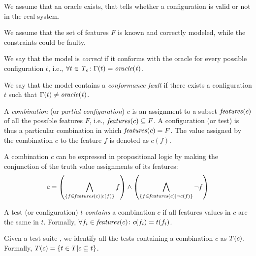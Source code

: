 \begin{tikzborder}{\cite{Gargantini16:validation}}
\begin{tikzborder}{\cite{gargantini_combinatorial_2017}}
\begin{tikzborder}{\cite{gargantini_combinatorial_2017}}
\begin{tikzborder}{\cite{garn2019}}
\begin{tikzborder}{\cite{arcaini2019achieving}}
\begin{tikzborder}{\cite{arcaini2019varivolution}}
		We assume that an oracle exists, that tells whether a configuration is valid or not in the real system.
		
		We assume that the set of features $F$ is known and correctly modeled, while the constraints could be faulty.
		
		\begin{mydef}\label{def:varivolution_correctness}
			We say that the model \m is \emph{correct} if it conforms with the oracle for every possible configuration $t$, i.e., $\forall t \in \mathit{T_e} \colon \Gamma(t) = \mathit{oracle(t)}$. 
		\end{mydef}
		
		\begin{mydef}\label{def:conformanceFault}
			We say that the model contains a \emph{conformance fault} if there exists a configuration $t$ such that $\Gamma(t) \neq \mathit{oracle(t)}$.
		\end{mydef}
		
		\begin{mydef}[Combination]\label{def:combination1}
			A \emph{combination} (or \emph{partial configuration}) $c$ is an assignment to a subset $\mathit{features}(c)$ of all the possible features $F$, i.e., $\mathit{features}(c) \subseteq F$. A configuration (or test) is thus a particular combination in which $\mathit{features}(c)=F$. The value assigned by the combination $c$ to the feature $f$ is denoted as $c(f)$.
		\end{mydef}
		
		\begin{mydef}
			A combination $c$ can be expressed in propositional logic by making the conjunction of the truth value assignments of its features:
			\[c = \left(\bigwedge_{\{f \in \mathit{features}(c) | c(f) \}} f\right) \wedge \left(\bigwedge_{\{f \in \mathit{features}(c) | \neg c(f) \}} \neg f\right)\]
		\end{mydef}
		
		\begin{mydef}\label{def:combContainment1}
			A test (or configuration) $t$ \emph{contains} a combination $c$ if all features values in $c$ are the same in $t$. Formally, $\forall f_i \in \mathit{features}(c) \colon c(f_i) = t(f_i)$.
			
			Given a test suite \testSuite, we identify all the tests containing a combination $c$ as $T(c)$. Formally, $T(c) = \{t \in T | c \subseteq t\}$.
		\end{mydef}
		

\end{tikzborder}
\end{tikzborder}
\end{tikzborder}
\end{tikzborder}
\end{tikzborder}
\end{tikzborder}
